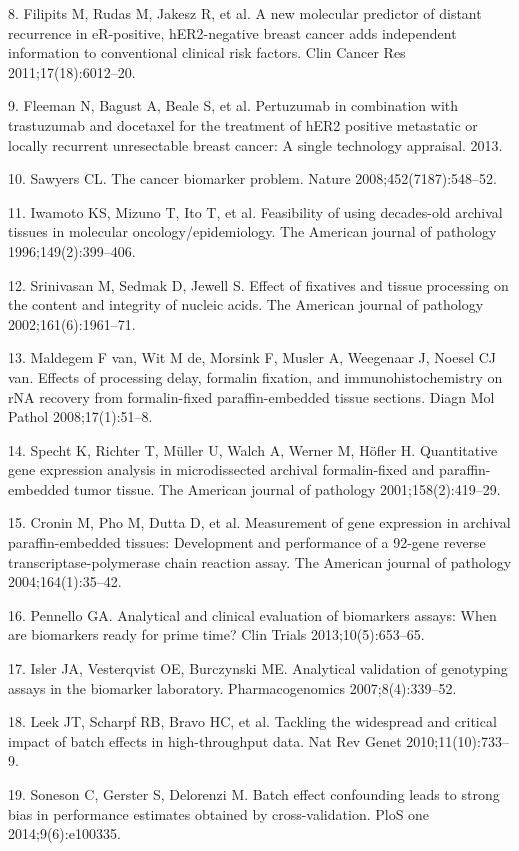 \documentclass[11pt]{article}
\begin{document}
8. Filipits M, Rudas M, Jakesz R, et al. A new molecular predictor of
distant recurrence in eR-positive, hER2-negative breast cancer adds
independent information to conventional clinical risk factors. Clin
Cancer Res 2011;17(18):6012--20.

9. Fleeman N, Bagust A, Beale S, et al. Pertuzumab in combination with
trastuzumab and docetaxel for the treatment of hER2 positive metastatic
or locally recurrent unresectable breast cancer: A single technology
appraisal. 2013.

10. Sawyers CL. The cancer biomarker problem. Nature
2008;452(7187):548--52.

11. Iwamoto KS, Mizuno T, Ito T, et al. Feasibility of using decades-old
archival tissues in molecular oncology/epidemiology. The American
journal of pathology 1996;149(2):399--406.

12. Srinivasan M, Sedmak D, Jewell S. Effect of fixatives and tissue
processing on the content and integrity of nucleic acids. The American
journal of pathology 2002;161(6):1961--71.

13. Maldegem F van, Wit M de, Morsink F, Musler A, Weegenaar J, Noesel
CJ van. Effects of processing delay, formalin fixation, and
immunohistochemistry on rNA recovery from formalin-fixed
paraffin-embedded tissue sections. Diagn Mol Pathol 2008;17(1):51--8.

14. Specht K, Richter T, M{ü}ller U, Walch A, Werner M, H{ö}fler H.
Quantitative gene expression analysis in microdissected archival
formalin-fixed and paraffin-embedded tumor tissue. The American journal
of pathology 2001;158(2):419--29.

15. Cronin M, Pho M, Dutta D, et al. Measurement of gene expression in
archival paraffin-embedded tissues: Development and performance of a
92-gene reverse transcriptase-polymerase chain reaction assay. The
American journal of pathology 2004;164(1):35--42.

16. Pennello GA. Analytical and clinical evaluation of biomarkers
assays: When are biomarkers ready for prime time? Clin Trials
2013;10(5):653--65.

17. Isler JA, Vesterqvist OE, Burczynski ME. Analytical validation of
genotyping assays in the biomarker laboratory. Pharmacogenomics
2007;8(4):339--52.

18. Leek JT, Scharpf RB, Bravo HC, et al. Tackling the widespread and
critical impact of batch effects in high-throughput data. Nat Rev Genet
2010;11(10):733--9.

19. Soneson C, Gerster S, Delorenzi M. Batch effect confounding leads to
strong bias in performance estimates obtained by cross-validation. PloS
one 2014;9(6):e100335.
\end{document}
